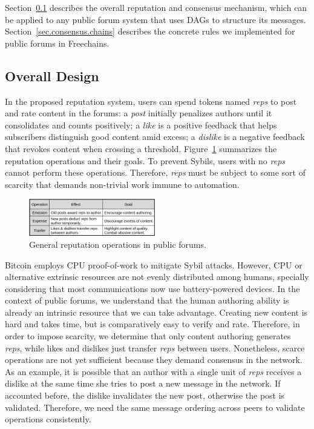 \documentclass[10pt,journal,compsoc]{IEEEtran}
\newcommand{\FC}       {Freechains\xspace}
\newcommand{\reps}     {\emph{reps}\xspace}
\begin{document}
Section~\ref{sec.consensus.design} describes the overall reputation and
consensus mechanism, which can be applied to any public forum system that uses
DAGs to structure its messages.
Section~\ref{sec.consensus.chains} describes the concrete rules we implemented
for public forums in \FC.

\subsection{Overall Design}
\label{sec.consensus.design}

In the proposed reputation system, users can spend tokens named \reps to post
and rate content in the forums:
a \emph{post} initially penalizes authors until it consolidates and counts
positively;
a \emph{like} is a positive feedback that helps subscribers distinguish good
content amid excess;
a \emph{dislike} is a negative feedback that revokes content when crossing a
threshold.
Figure~\ref{fig.general} summarizes the reputation operations and their goals.
To prevent Sybils, users with no \reps cannot perform these operations.
Therefore, \reps must be subject to some sort of scarcity that demands
non-trivial work immune to automation.

\begin{figure}
\centering
\includegraphics[width=0.49\textwidth]{general.png}
\caption{General reputation operations in public forums.}
\label{fig.general}
\end{figure}

Bitcoin employs CPU proof-of-work to mitigate Sybil attacks.
However, CPU or alternative extrinsic resources are not evenly distributed
among humans, specially considering that most communications now use
battery-powered devices.
%
In the context of public forums, we understand that the human authoring ability
is already an intrinsic resource that we can take advantage.
Creating new content is hard and takes time, but is comparatively easy to
verify and rate.
Therefore, in order to impose scarcity, we determine that only content
authoring generates \reps, while likes and dislikes just transfer \reps between
users.
%
Nonetheless, scarce operations are not yet sufficient because they demand
consensus in the network.
As an example, it is possible that an author with a single unit of \reps
receives a dislike at the same time she tries to post a new message in the
network.
If accounted before, the dislike invalidates the new post, otherwise the post
is validated.
Therefore, we need the same message ordering across peers to validate
operations consistently.
\end{document}
